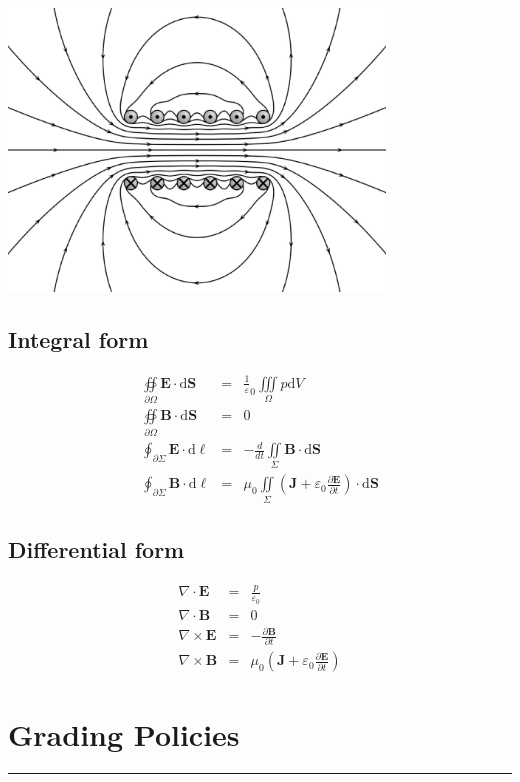 \documentclass[letterpaper,10pt,titlepage,fleqn]{article}
\begin{document}
\centerline{\includegraphics[width=0.75\textwidth]{maxwell.eps}}
\subsection*{Integral form}

\begin{eqnarray}
 \oiint\limits_{\partial{\Omega}} \mathbf{E} \cdot \text{d} \mathbf{S} &=& \frac{1}{\varepsilon}_{0}\iiint\limits_{\Omega} p \text{d}V\\
\oiint\limits_{\partial{\Omega}} \mathbf{B} \cdot \text{d} \mathbf{S} &=& 0\\
 \oint _{\partial{\Sigma}} \mathbf{E} \cdot \text{d} \ell &=& - \frac{d}{dt} \iint \limits_{\Sigma} \mathbf{B} \cdot \text{d} \mathbf{S}\\
 \oint _{\partial{\Sigma}} \mathbf{B} \cdot \text{d} \ell &=& \mu_{0} \iint \limits_{\Sigma} (\mathbf{J}+\varepsilon_{0} \frac{\partial \mathbf{E}}{\partial t}) \cdot \text{d} \mathbf{S}
\end{eqnarray}
\subsection*{Differential form}
\begin{eqnarray}
\nabla \cdot \mathbf{E} &=& \frac{p}{\varepsilon_{0}}\\
\nabla \cdot \mathbf{B} &=& 0\\
\nabla \times \mathbf{E} &=& -\frac{\partial{\mathbf{B}}}{\partial t}\\
\nabla \times \mathbf{B} &=& \mu_{0}(\mathbf{J}+\varepsilon_{0} \frac{\partial{\mathbf{E}}}{\partial t})
\end{eqnarray}
\section*{Grading Policies}
\hrule
\end{document}
